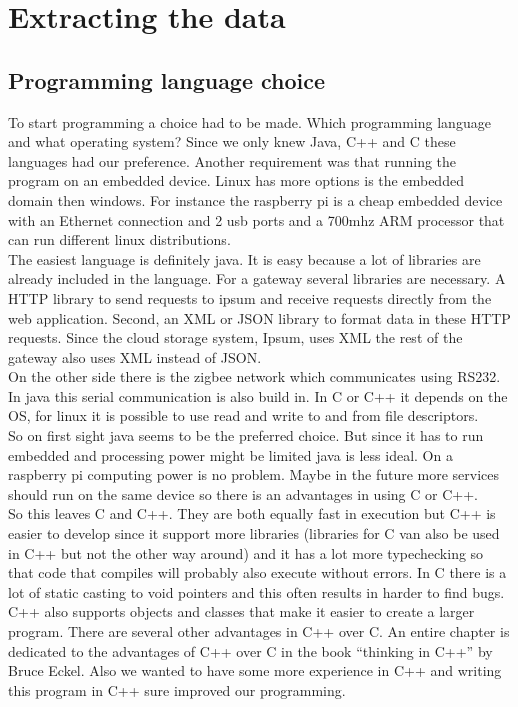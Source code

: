 \section{Extracting the data}
\subsection{Programming language choice}
To start programming a choice had to be made. Which programming language and what operating system? Since we only knew Java, C++ and C these languages had our preference. Another requirement was that running the program on an embedded device. Linux has more options is the embedded domain then windows. For instance the raspberry pi is a cheap embedded device with an Ethernet connection and 2 usb ports and a 700mhz ARM processor that can run different linux distributions.\\
The easiest language is definitely java. It is easy because a lot of libraries are already included in the language. For a gateway several libraries are necessary. A HTTP library to send requests to ipsum and receive requests directly from the web application. Second, an XML or JSON library to format data in these HTTP requests. Since the cloud storage system, Ipsum, uses XML the rest of the gateway also uses XML instead of JSON.\\
On the other side there is the zigbee network which communicates using RS232. In java this serial communication is also build in. In C or C++ it depends on the OS, for linux it is possible to use read and write to and from file descriptors.\\
So on first sight java seems to be the preferred choice. But since it has to run embedded and processing power might be limited java is less ideal. On a raspberry pi computing power is no problem. Maybe in the future more services should run on the same device so there is an advantages in using C or C++.\\
So this leaves C and C++. They are both equally fast in execution but C++ is easier to develop since  it support more libraries (libraries for C van also be used in C++ but not the other way around) and it has a lot more typechecking so that code that compiles will probably also execute without errors. In C there is a lot of static casting to void pointers and this often results in harder to find bugs. C++ also supports objects and classes that make it easier to create a larger program. There are several other advantages in C++ over C. An entire chapter is dedicated to the advantages of C++ over C in the book “thinking in C++” by Bruce Eckel. Also we wanted to have some more experience in C++ and writing this program in C++ sure improved our programming.
